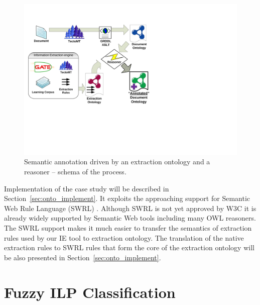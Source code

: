 \begin{figure}
\centerline{\includegraphics[angle=-90, width=0.7\hsize]{semantic_rules_app_schema}}
\caption{Semantic annotation driven by an extraction ontology and a reasoner -- schema of the process.}
\label{fig:rules_app_schema}
\end{figure}

Implementation of the case study will be described in Section~\ref{sec:onto_implement}. It exploits the approaching support for Semantic Web Rule Language (SWRL) \citep{SWRL}. Although SWRL is not yet approved by W3C it is already widely supported by Semantic Web tools including many OWL reasoners. The SWRL support makes it much easier to transfer the semantics of extraction rules used by our IE tool to extraction ontology. The translation of the native extraction rules to SWRL rules that form the core of the extraction ontology will be also presented in Section~\ref{sec:onto_implement}.







\section{Fuzzy ILP Classification} \label{sec:fuzzy_methods}
\graphicspath{{../img/ch80/}}

